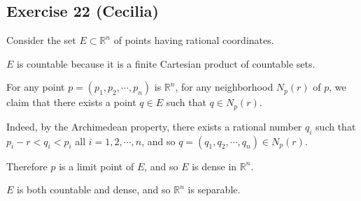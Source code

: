 \subsection*{Exercise 22 (Cecilia)}
Consider the set $ E \subset \mathbb{R}^n $ of points having rational coordinates.

$ E $ is countable because it is a finite Cartesian product of countable sets.

For any point $ p = (p_1, p_2, \cdots, p_n )$ is $ \mathbb{R}^n $, for any neighborhood $ N_p(r) $ of $ p $, we claim that there exists a point $ q \in E $ such that $ q \in N_p(r) $.

Indeed, by the Archimedean property, there exists a rational number $ q_i $ such that $ p_i - r < q_i < p_i $ all $ i = 1, 2, \cdots, n $, and so $ q = (q_1, q_2, \cdots, q_n) \in N_p(r) $.

Therefore $ p $ is a limit point of $ E $, and so $ E $ is dense in $ \mathbb{R}^n $.

$ E $ is both countable and dense, and so $ \mathbb{R}^n $ is separable.